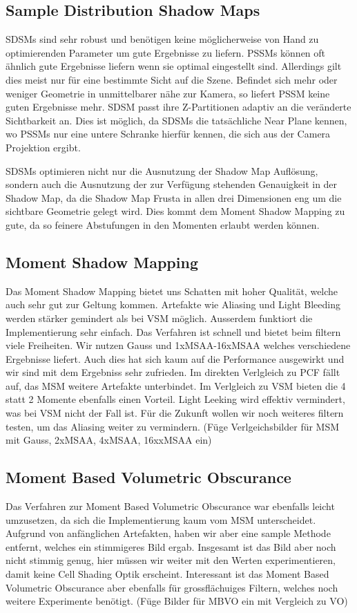 \documentclass[runningheaders,a4paper]{llncs}
\begin{document}
\subsection{Sample Distribution Shadow Maps}
SDSMs sind sehr robust und benötigen keine möglicherweise von Hand zu optimierenden Parameter um gute Ergebnisse zu liefern.
PSSMs können oft ähnlich gute Ergebnisse liefern wenn sie optimal eingestellt sind.
Allerdings gilt dies meist nur für eine bestimmte Sicht auf die Szene.
Befindet sich mehr oder weniger Geometrie in unmittelbarer nähe zur Kamera, so liefert PSSM keine guten Ergebnisse mehr.
SDSM passt ihre Z-Partitionen adaptiv an die veränderte Sichtbarkeit an.
Dies ist möglich, da SDSMs die tatsächliche Near Plane kennen, wo PSSMs nur eine untere Schranke hierfür kennen, die sich aus der Camera Projektion ergibt.

SDSMs optimieren nicht nur die Ausnutzung der Shadow Map Auflösung, sondern auch die Ausnutzung der zur Verfügung stehenden Genauigkeit in der Shadow Map, da die Shadow Map Frusta in allen drei Dimensionen eng um die sichtbare Geometrie gelegt wird.
Dies kommt dem Moment Shadow Mapping zu gute, da so feinere Abstufungen in den Momenten erlaubt werden können.


\subsection{Moment Shadow Mapping}
Das Moment Shadow Mapping bietet uns Schatten mit hoher Qualität, welche auch sehr gut zur Geltung kommen. Artefakte wie Aliasing und Light Bleeding werden stärker gemindert als bei VSM möglich. Ausserdem funktiort die Implementierung sehr einfach. Das Verfahren ist schnell und bietet beim filtern viele Freiheiten. Wir nutzen Gauss und 1xMSAA-16xMSAA welches verschiedene Ergebnisse liefert.
Auch dies hat sich kaum auf die Performance ausgewirkt und wir sind mit dem Ergebniss sehr zufrieden.
Im direkten Verlgleich zu PCF fällt auf, das MSM weitere Artefakte unterbindet. Im Verlgleich zu VSM bieten die 4 statt 2 Momente ebenfalls einen Vorteil. Light Leeking wird effektiv vermindert, was bei VSM nicht der Fall ist.
Für die Zukunft wollen wir noch weiteres filtern testen, um das Aliasing weiter zu vermindern.
(Füge Verlgeichsbilder für MSM mit Gauss, 2xMSAA, 4xMSAA, 16xxMSAA ein)


\subsection{Moment Based Volumetric Obscurance}
Das Verfahren zur Moment Based Volumetric Obscurance war ebenfalls leicht umzusetzen, da sich die Implementierung kaum vom MSM unterscheidet. Aufgrund von anfänglichen Artefakten, haben wir aber eine sample Methode entfernt, welches ein stimmigeres Bild ergab. Insgesamt ist das Bild aber noch nicht stimmig genug, hier müssen wir weiter mit den Werten experimentieren, damit keine Cell Shading Optik erscheint. Interessant ist das Moment Based Volumetric Obscurance aber ebenfalls für grossflächuiges Filtern, welches noch weitere Experimente benötigt.
(Füge Bilder für MBVO ein mit Vergleich zu VO)





\end{document}
